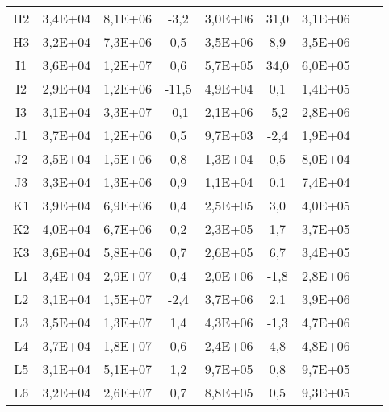\begin{center}
\begin{longtable}{ccccccccc}
    H2    & 3,4E+04 & 8,1E+06 & -3,2  & 3,0E+06 & 31,0  & 3,1E+06 \\
    H3    & 3,2E+04 & 7,3E+06 & 0,5   & 3,5E+06 & 8,9   & 3,5E+06 \\
    I1    & 3,6E+04 & 1,2E+07 & 0,6   & 5,7E+05 & 34,0  & 6,0E+05 \\
    I2    & 2,9E+04 & 1,2E+06 & -11,5 & 4,9E+04 & 0,1   & 1,4E+05 \\
    I3    & 3,1E+04 & 3,3E+07 & -0,1  & 2,1E+06 & -5,2  & 2,8E+06 \\
    J1    & 3,7E+04 & 1,2E+06 & 0,5   & 9,7E+03 & -2,4  & 1,9E+04 \\
    J2    & 3,5E+04 & 1,5E+06 & 0,8   & 1,3E+04 & 0,5   & 8,0E+04 \\
    J3    & 3,3E+04 & 1,3E+06 & 0,9   & 1,1E+04 & 0,1   & 7,4E+04 \\
    K1    & 3,9E+04 & 6,9E+06 & 0,4   & 2,5E+05 & 3,0   & 4,0E+05 \\
    K2    & 4,0E+04 & 6,7E+06 & 0,2   & 2,3E+05 & 1,7   & 3,7E+05 \\
    K3    & 3,6E+04 & 5,8E+06 & 0,7   & 2,6E+05 & 6,7   & 3,4E+05 \\
    L1    & 3,4E+04 & 2,9E+07 & 0,4   & 2,0E+06 & -1,8  & 2,8E+06 \\
    L2    & 3,1E+04 & 1,5E+07 & -2,4  & 3,7E+06 & 2,1   & 3,9E+06 \\
    L3    & 3,5E+04 & 1,3E+07 & 1,4   & 4,3E+06 & -1,3  & 4,7E+06 \\
    L4    & 3,7E+04 & 1,8E+07 & 0,6   & 2,4E+06 & 4,8   & 4,8E+06 \\
    L5    & 3,1E+04 & 5,1E+07 & 1,2   & 9,7E+05 & 0,8   & 9,7E+05 \\
    L6    & 3,2E+04 & 2,6E+07 & 0,7   & 8,8E+05 & 0,5   & 9,3E+05 \\
\end{longtable}
\end{center}

